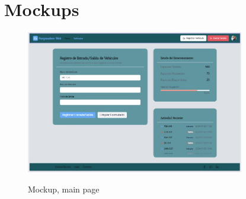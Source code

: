 \section{Mockups}
\begin{figure}[h!]
    \centering
    \includegraphics[width=0.85\textwidth]{Mockups/mkup-1.jpeg}
    \label{fig:mkup-1.}
    \caption{Mockup, main page}
\end{figure}
